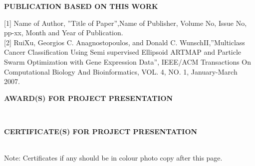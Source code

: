 \begin{center}
\textbf{\Large PUBLICATION BASED ON THIS WORK}
\end{center}
\vspace{1cm}
[1]	Name of Author, ”Title of Paper”,Name of Publisher, Volume No, Issue No, pp-xx, Month and Year of Publication.\\

[2] RuiXu, Georgios C. Anagnostopoulos, and Donald C. WunschII,”Multiclass Cancer Classification Using Semi supervised Ellipsoid ARTMAP and Particle Swarm Optimization with Gene Expression Data”, IEEE/ACM Transactions On Computational Biology And Bioinformatics, VOL. 4, NO. 1, January-March 2007.         
\vspace{2cm}
\begin{center}
\textbf{\Large AWARD(S) FOR PROJECT PRESENTATION }
\end{center}\\
\vspace{3cm}
\begin{center}
\textbf{\Large CERTIFICATE(S) FOR PROJECT PRESENTATION  }
\end{center}\\
Note: Certificates if any should be in colour photo copy after this page.
\vspace{4cm}



